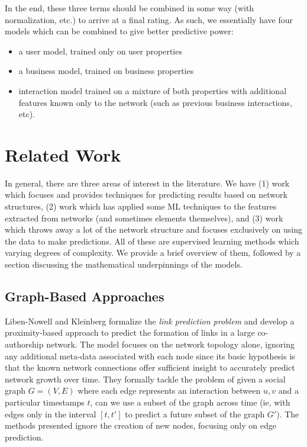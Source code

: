 \documentclass[letterpaper, 10 pt, conference]{ieeeconf}  %
\begin{document}
In the end, these three terms should be combined in some way (with normalization, etc.) to arrive at a final rating. As such, we essentially have four models which can be combined to give better predictive power:

\begin{itemize}
\item a user model, trained only on user properties
\item a business model, trained on business properties
\item interaction model trained on a mixture of both properties with additional features known only to the network (such as previous business interactions, etc).
\end{itemize}

\section{Related Work}
In general, there are three areas of interest in the literature. We have (1) work which focuses and provides techniques for predicting results based on network structures, (2) work which has applied some ML techniques to the features extracted from networks (and sometimes elements themselves), and (3) work which throws away a lot of the network structure and focuses exclusively on using the data to make predictions. All of these are supervised learning methods which varying degrees of complexity. We provide a brief overview of them, followed by a section discussing the mathematical underpinnings of the models.

\subsection{Graph-Based Approaches}

Liben-Nowell and Kleinberg \cite{TheLinkPredictionProblemForSocialNetworks} formalize the \textit{link prediction problem} and develop a proximity-based approach to predict the formation of links in a large co-authorship network. The model focuses on the network topology alone, ignoring any additional meta-data associated with each node since its basic hypothesis is that the known network connections offer sufficient insight to accurately predict network growth over time. They formally tackle the problem of given a social graph $G = (V,E)$ where each edge represents an interaction between $u,v$ and a particular timestamps $t$, can we use a subset of the graph across time (ie, with edges only in the interval $[t,t']$ to predict a future subset of the graph $G'$). The methods presented ignore the creation of new nodes, focusing only on edge prediction.
\end{document}
